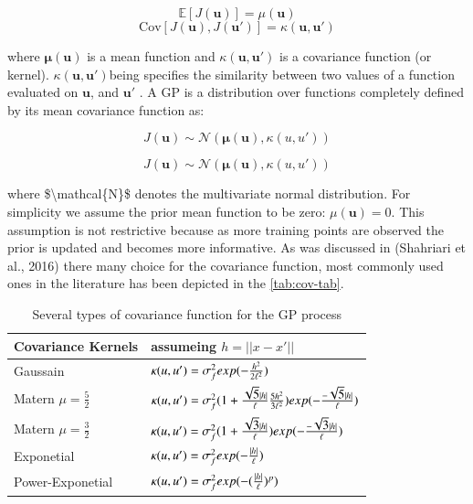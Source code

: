 \documentclass[]{elsarticle} %
\begin{document}
\[\mathbb{E}[J(\mathbf{u})] = \mu(\mathbf{u})\] \[ \text{Cov} [J(\mathbf{u}),J(\mathbf{u'})]= \kappa(\mathbf{u},\mathbf{u'})\]

where \(\mathbf{\mu(u)}\) is a mean function and \(\kappa(\mathbf{u},\mathbf{u'})\) is a covariance function (or kernel). \(\kappa(\mathbf{u},\mathbf{u'})\)being specifies the similarity between two values of a function evaluated on \(\mathbf{u}\), and \(\mathbf{u'}\) . A GP is a distribution over functions completely defined by its mean covariance function as:

\begin{equation}
J(\mathbf{u}) \sim \mathcal{N}(\mathbf{\mu(u)}, \kappa(u,u'))
\label{eq:mean_cov_gp}
\end{equation}

\[J(\mathbf{u}) \sim \mathcal{N}(\mathbf{\mu(u)}, \kappa(u,u'))\]

where \$\textbackslash mathcal\{N\}\$ denotes the multivariate normal distribution. For simplicity we assume the prior mean function to be zero: \(\mu(\mathbf{u}) = 0\). This assumption is not restrictive because as more training points are observed the prior is updated and becomes more informative. As was discussed in (Shahriari et al., 2016) there many choice for the covariance function, most commonly used ones in the literature has been depicted in the \ref{tab:cov-tab}.

\begin{table}[H]

\caption{\label{tab:cov-table} Several types of covariance function for the GP process}
\centering
\begin{tabu} to 
\toprule
Covariance Kernels & assumeing $h=||x-x'||$\\
\midrule
Gaussain & $\Large \kappa (u,u') =\sigma_f^2 exp(-\frac{h^2}{2\ell^2})$\\
Matern $\mu=\frac{5}{2}$ & $\Large \kappa (u,u') =\sigma_f^2(1 + \frac{\sqrt{5}|h|}{\ell}\frac{5h^2}{3\ell^2})exp(-\frac{ -\sqrt{5}|h|}{\ell})$\\
Matern $\mu=\frac{3}{2}$ & $\Large \kappa (u,u') =\sigma_f^2(1 + \frac{\sqrt{3}|h|}{\ell})exp(-\frac{-\sqrt{3}|h|}{\ell})$\\
Exponetial & $\Large \kappa (u,u') =\sigma_f^2 exp(-\frac{|h|}{\ell})$\\
Power-Exponetial & $\Large \kappa (u,u') =\sigma_f^2 exp(-(\frac{|h|}{\ell})^p)$\\
\bottomrule
\end{tabu}
\end{table}
\end{document}
